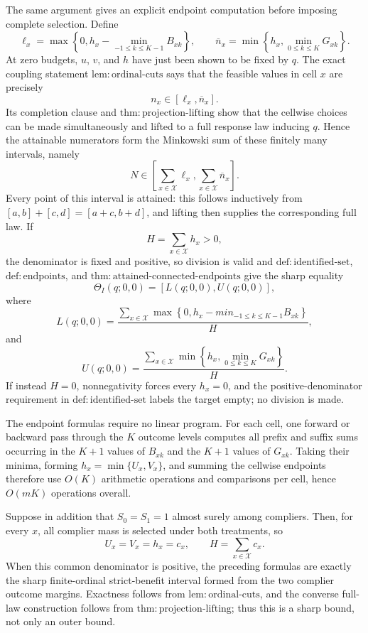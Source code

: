 The same argument gives an explicit endpoint computation before imposing complete selection.  Define
\[
  \ell_x=
  \max\!\left\{0,h_x-
     \min_{-1\leq k\leq K-1}B_{xk}\right\},
  \qquad
  \overline n_x=
  \min\!\left\{h_x,
     \min_{0\leq k\leq K}G_{xk}\right\}.
\]
At zero budgets, \(u\), \(v\), and \(h\) have just been shown to be fixed by \(q\).  The exact coupling statement \(\mathrm{lem:ordinal\text{-}cuts}\) says that the feasible values in cell \(x\) are precisely
\[
  n_x\in[\ell_x,\overline n_x].
\]
Its completion clause and \(\mathrm{thm:projection\text{-}lifting}\) show that the cellwise choices can be made simultaneously and lifted to a full response law inducing \(q\).  Hence the attainable numerators form the Minkowski sum of these finitely many intervals, namely
\[
  N\in
  \left[\sum_{x\in\mathcal X}\ell_x,
        \sum_{x\in\mathcal X}\overline n_x\right].
\]
Every point of this interval is attained: this follows inductively from
\([a,b]+[c,d]=[a+c,b+d]\), and lifting then supplies the corresponding full law.  If
\[
  H=\sum_{x\in\mathcal X}h_x>0,
\]
the denominator is fixed and positive, so division is valid and \(\mathrm{def:identified\text{-}set}\), \(\mathrm{def:endpoints}\), and \(\mathrm{thm:attained\text{-}connected\text{-}endpoints}\) give the sharp equality
\[
  \Theta_I(q;0,0)=[L(q;0,0),U(q;0,0)],
\]
where
\[
  L(q;0,0)=
  \frac{\displaystyle\sum_{x\in\mathcal X}
    \max\!\left\{0,h_x-min_{-1\leq k\leq K-1}B_{xk}\right\}}
       {\displaystyle H},
\]
and
\[
  U(q;0,0)=
  \frac{\displaystyle\sum_{x\in\mathcal X}
    \min\!\left\{h_x,\min_{0\leq k\leq K}G_{xk}\right\}}
       {\displaystyle H}.
\]
If instead \(H=0\), nonnegativity forces every \(h_x=0\), and the positive-denominator requirement in \(\mathrm{def:identified\text{-}set}\) labels the target empty; no division is made.

The endpoint formulas require no linear program.  For each cell, one forward or backward pass through the \(K\) outcome levels computes all prefix and suffix sums occurring in the \(K+1\) values of \(B_{xk}\) and the \(K+1\) values of \(G_{xk}\).  Taking their minima, forming \(h_x=\min\{U_x,V_x\}\), and summing the cellwise endpoints therefore use \(O(K)\) arithmetic operations and comparisons per cell, hence \(O(mK)\) operations overall.

Suppose in addition that \(S_0=S_1=1\) almost surely among compliers.  Then, for every \(x\), all complier mass is selected under both treatments, so
\[
  U_x=V_x=h_x=c_x,
  \qquad
  H=\sum_{x\in\mathcal X}c_x.
\]
When this common denominator is positive, the preceding formulas are exactly the sharp finite-ordinal strict-benefit interval formed from the two complier outcome margins.  Exactness follows from \(\mathrm{lem:ordinal\text{-}cuts}\), and the converse full-law construction follows from \(\mathrm{thm:projection\text{-}lifting}\); thus this is a sharp bound, not only an outer bound.

